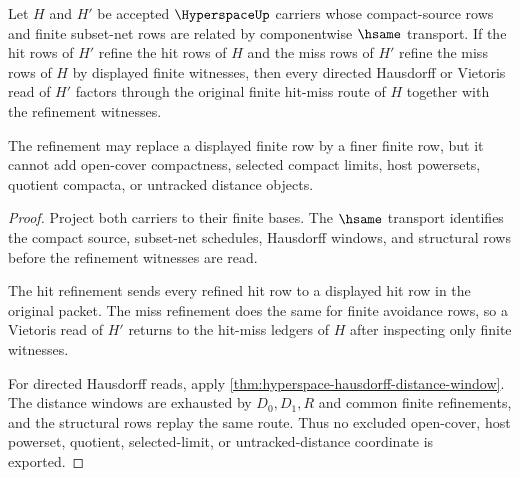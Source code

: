 \begin{theorem}
\label{thm:hyperspace-hit-miss-directed-refinement}
Let $H$ and $H'$ be accepted $\HyperspaceUp$ carriers whose compact-source rows and finite subset-net rows are related by componentwise $\hsame$ transport. If the hit rows of $H'$ refine the hit rows of $H$ and the miss rows of $H'$ refine the miss rows of $H$ by displayed finite witnesses, then every directed Hausdorff or Vietoris read of $H'$ factors through the original finite hit-miss route of $H$ together with the refinement witnesses.

The refinement may replace a displayed finite row by a finer finite row, but it cannot add open-cover compactness, selected compact limits, host powersets, quotient compacta, or untracked distance objects.
\end{theorem}
\begin{proof}
Project both carriers to their finite bases. The $\hsame$ transport identifies the compact source, subset-net schedules, Hausdorff windows, and structural rows before the refinement witnesses are read.

The hit refinement sends every refined hit row to a displayed hit row in the original packet. The miss refinement does the same for finite avoidance rows, so a Vietoris read of $H'$ returns to the hit-miss ledgers of $H$ after inspecting only finite witnesses.

For directed Hausdorff reads, apply \autoref{thm:hyperspace-hausdorff-distance-window}. The distance windows are exhausted by $D_0,D_1,R$ and common finite refinements, and the structural rows replay the same route. Thus no excluded open-cover, host powerset, quotient, selected-limit, or untracked-distance coordinate is exported.
\end{proof}

